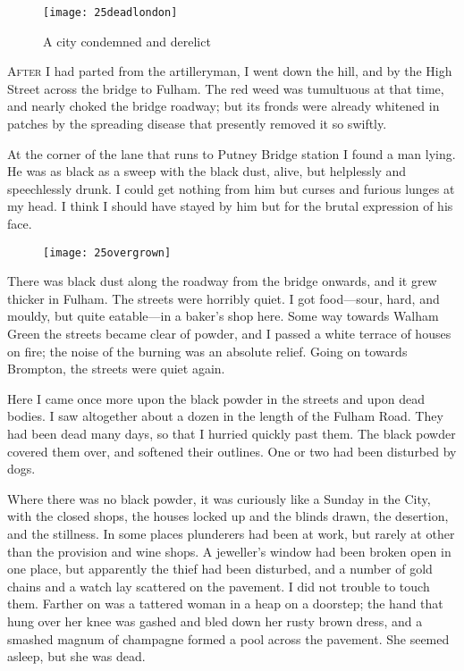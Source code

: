 

\begin{figure}[p]
\centering
\texttt{[image: 25deadlondon]}
\caption{A city condemned and derelict}
\end{figure}

\lettrine[lines=4]{A}{fter} I had parted from the artilleryman, I went down the hill, and by the High Street across the bridge to Fulham. The red weed was tumultuous at that time, and nearly choked the bridge roadway; but its fronds were already whitened in patches by the spreading disease that presently removed it so swiftly.

At the corner of the lane that runs to Putney Bridge station I found a man lying. He was as black as a sweep with the black dust, alive, but helplessly and speechlessly drunk. I could get nothing from him but curses and furious lunges at my head. I think I should have stayed by him but for the brutal expression of his face.

\begin{figure}[tb!]
\centering
\texttt{[image: 25overgrown]}
\end{figure}

There was black dust along the roadway from the bridge onwards, and it grew thicker in Fulham. The streets were horribly quiet. I got food—sour, hard, and mouldy, but quite eatable—in a baker's shop here. Some way towards Walham Green the streets became clear of powder, and I passed a white terrace of houses on fire; the noise of the burning was an absolute relief. Going on towards Brompton, the streets were quiet again.

Here I came once more upon the black powder in the streets and upon dead bodies. I saw altogether about a dozen in the length of the Fulham Road. They had been dead many days, so that I hurried quickly past them. The black powder covered them over, and softened their outlines. One or two had been disturbed by dogs.



Where there was no black powder, it was curiously like a Sunday in the City, with the closed shops, the houses locked up and the blinds drawn, the desertion, and the stillness. In some places plunderers had been at work, but rarely at other than the provision and wine shops. A jeweller's window had been broken open in one place, but apparently the thief had been disturbed, and a number of gold chains and a watch lay scattered on the pavement. I did not trouble to touch them. Farther on was a tattered woman in a heap on a doorstep; the hand that hung over her knee was gashed and bled down her rusty brown dress, and a smashed magnum of champagne formed a pool across the pavement. She seemed asleep, but she was dead.


